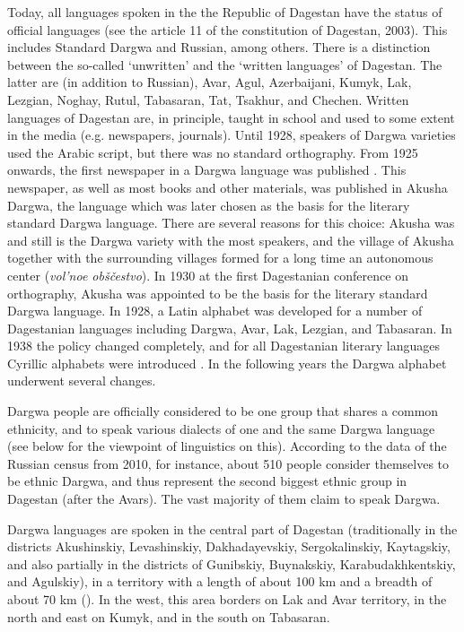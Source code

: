 Today, all languages spoken in the the Republic of Dagestan have the status of official languages (see the article 11 of the constitution of Dagestan, 2003). This includes Standard Dargwa and Russian, among others. There is a distinction between the so-called `unwritten' and the `written languages' of Dagestan. The latter are (in addition to Russian), Avar, Agul, Azerbaijani, Kumyk, Lak, Lezgian, Noghay, Rutul, Tabasaran, Tat, Tsakhur, and Chechen. Written languages of Dagestan are, in principle, taught in school and used to some extent in the media (e.g. newspapers, journals). Until 1928, speakers of Dargwa varieties used the Arabic script, but there was no standard orthography. From 1925 onwards, the first newspaper in a Dargwa language was published \citep[15]{Abdullaev1954}. This newspaper, as well as most books and other materials, was published in Akusha Dargwa, the language which was later chosen as the basis for the literary standard Dargwa language. There are several reasons for this choice: Akusha was and still is the Dargwa variety with the most speakers, and the village of Akusha together with the surrounding villages formed for a long time an autonomous center (\textit{vol'noe obščestvo}). In 1930 at the first Dagestanian conference on orthography, Akusha was appointed to be the basis for the literary standard Dargwa language. In 1928, a Latin alphabet was developed for a number of Dagestanian languages including Dargwa, Avar, Lak, Lezgian, and Tabasaran. In 1938 the policy changed completely, and for all Dagestanian literary languages Cyrillic alphabets were introduced \citep[48]{Grenoble2003}. In the following years the Dargwa alphabet underwent several changes.

Dargwa people are officially considered to be one group that shares a common ethnicity, and to speak various dialects of one and the same Dargwa language (see below for the viewpoint of linguistics on this). According to the data of the Russian census from 2010, for instance, about 510 people consider themselves to be ethnic Dargwa, and thus represent the second biggest ethnic group in Dagestan (after the Avars). The vast majority of them claim to speak Dargwa.

Dargwa languages are spoken in the central part of Dagestan (traditionally in the districts Akushinskiy, Levashinskiy, Dakhadayevskiy, Sergokalinskiy, Kaytagskiy, and also partially in the districts of Gunibskiy, Buynakskiy, Karabudakhkentskiy, and Agulskiy), in a territory with a length of about 100 km and a breadth of about 70 km (). In the west, this area borders on Lak and Avar territory, in the north and east on Kumyk, and in the south on Tabasaran.


